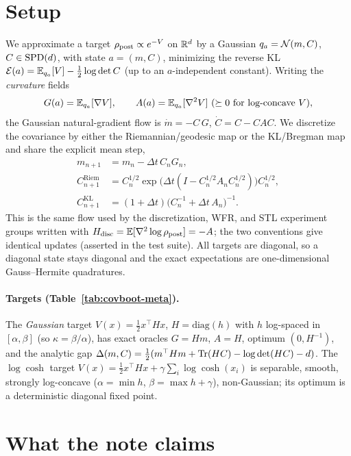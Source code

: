 \documentclass[11pt]{article}
\newcommand{\Delt}{\Delta t}
\begin{document}
\section{Setup}
\label{sec:setup}

We approximate a target $\rho_{\mathrm{post}}\propto e^{-V}$ on $\mathbb{R}^d$ by a Gaussian
$q_a=\mathcal{N}(m,C)$, $C\in\mathrm{SPD}(d)$, with state $a=(m,C)$, minimizing the reverse KL
$\mathcal E(a)=\mathbb{E}_{q_a}[V]-\tfrac12\log\det C$ (up to an $a$-independent constant).
Writing the \emph{curvature} fields
\begin{equation}
G(a)=\mathbb{E}_{q_a}[\nabla V],\qquad A(a)=\mathbb{E}_{q_a}[\nabla^2 V]\ (\succeq 0\text{ for
log-concave }V),
\end{equation}
the Gaussian natural-gradient flow is $\dot m=-C\,G$, $\dot C=C-C A C$. We
discretize the covariance by either the Riemannian/geodesic map or the KL/Bregman
map and share the explicit mean step,
\begin{align}
m_{n+1}&=m_n-\Delt\,C_n G_n, \label{eq:mean}\\
C_{n+1}^{\mathrm{Riem}}&=C_n^{1/2}\exp\!\big(\Delt(I-C_n^{1/2}A_n C_n^{1/2})\big)C_n^{1/2},
\label{eq:riem}\\
C_{n+1}^{\mathrm{KL}}&=(1+\Delt)\big(C_n^{-1}+\Delt\,A_n\big)^{-1}. \label{eq:kl}
\end{align}
This is the same flow used by the discretization, WFR, and STL experiment groups
written with $H_{\mathrm{disc}}=\mathbb{E}[\nabla^2\log\rho_{\mathrm{post}}]=-A$; the two conventions
give identical updates (asserted in the test suite). All targets are diagonal, so
a diagonal state stays diagonal and the exact expectations are one-dimensional
Gauss--Hermite quadratures.

\paragraph{Targets (Table~\ref{tab:covboot-meta}).}
The \emph{Gaussian} target $V(x)=\tfrac12 x^\top H x$, $H=\mathrm{diag}(h)$ with
$h$ log-spaced in $[\alpha,\beta]$ (so $\kappa=\beta/\alpha$), has exact oracles
$G=Hm$, $A=H$, optimum $(0,H^{-1})$, and the analytic gap
$\Delta(m,C)=\tfrac12(m^\top Hm+\operatorname{Tr}(HC)-\log\det(HC)-d)$. The \emph{$\log\cosh$}
target $V(x)=\tfrac12 x^\top Hx+\gamma\sum_i\log\cosh(x_i)$ is separable, smooth,
strongly log-concave ($\alpha=\min h$, $\beta=\max h+\gamma$), non-Gaussian; its
optimum is a deterministic diagonal fixed point.

\section{What the note claims}
\label{sec:theory}
\end{document}
